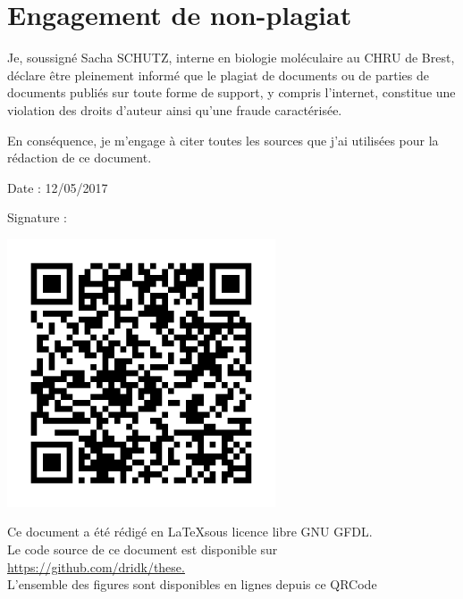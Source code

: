 \documentclass[12pt,a4paper]{article}
\begin{document}
\thispagestyle{empty}
\null
\newpage
\newpage
\thispagestyle{empty}
\setcounter{page}{0}
\thispagestyle{empty}
\section*{Engagement de non-plagiat}

Je, soussigné Sacha SCHUTZ, interne en biologie moléculaire au CHRU de Brest, déclare être pleinement informé que le plagiat de
documents ou de parties de documents publiés sur toute forme de
support, y compris l'internet, constitue une violation des droits
d'auteur ainsi qu'une fraude caractérisée.

En conséquence, je m'engage à citer toutes les sources que j'ai
utilisées pour la rédaction de ce document.

Date : 12/05/2017

\vspace{0.5cm}

Signature : \\
\vspace{0.5cm}



\vfill


\vspace{1cm}

\begin{center}
 \includegraphics[scale=2]{img/qrcode.png}\hfill
  
\vspace{1cm}

Ce document a été rédigé en \LaTeX sous licence libre GNU GFDL.\\ Le code source de ce document est disponible sur \url{https://github.com/dridk/these.} \\
L'ensemble des figures sont disponibles en lignes depuis ce QRCode
\end{center}
  
\end{document}

